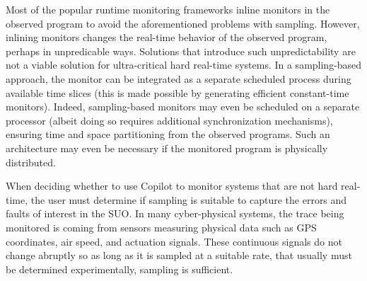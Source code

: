 Most of the popular runtime monitoring frameworks inline monitors in
the observed program to avoid the aforementioned problems with
sampling.  However, inlining monitors changes the real-time behavior
of the observed program, perhaps in unpredicable ways.
Solutions that
introduce such unpredictability are not a viable solution for
ultra-critical hard real-time systems.  In a sampling-based approach,
the monitor can be integrated as a separate scheduled process during
available time slices (this is made possible by generating efficient
constant-time monitors).  Indeed, sampling-based monitors may even be
scheduled on a separate processor (albeit doing so requires additional
synchronization mechanisms), ensuring time and space partitioning from
the observed programs.  Such an architecture may even be necessary if
the monitored program is physically distributed.

When deciding whether to use Copilot to monitor systems that are not hard real-time, the user must determine if
sampling is suitable to capture the errors and faults of interest in the  SUO. In many cyber-physical systems, the trace being monitored is
coming from sensors measuring physical data such as GPS coordinates, air speed, and actuation signals. These continuous signals do not
change abruptly so as long as it is sampled at a suitable rate, that usually must be determined experimentally, sampling is sufficient.



